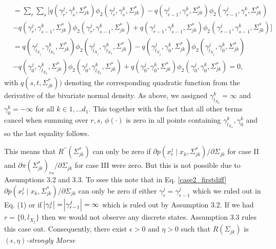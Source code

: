 \begin{condition}
\begin{condition}
\begin{equation*}
\begin{split}
                &= \sum_r\sum_s \Big[q(\gamma^j_r, \gamma^k_s, \Sigma_{jk}^*)\phi_2(\gamma^j_r, \gamma^k_s, \Sigma_{jk}^*) - q(\gamma^j_{r-1}, \gamma^k_s, \Sigma_{jk}^*)\phi_2(\gamma^j_{r-1}, \gamma^k_s, \Sigma_{jk}^*) \\
                &- q(\gamma^j_r, \gamma^k_{s-1}, \Sigma_{jk}^*)\phi_2(\gamma^j_r, \gamma^k_{s-1}, \Sigma_{jk}^*) + q(\gamma^j_{r-1}, \gamma^k_{s-1}, \Sigma_{jk}^*)\phi_2(\gamma^j_{r-1}, \gamma^k_{s-1}, \Sigma_{jk}^*)\Big] \\
                &= q(\gamma^j_{l_{X_j}}, \gamma^k_{l_{X_k}}, \Sigma_{jk}^*)\phi_2(\gamma^j_{l_{X_j}}, \gamma^k_{l_{X_k}}, \Sigma_{jk}^*) - q(\gamma^j_{l_{X_j}}, \gamma^k_0, \Sigma_{jk}^*)\phi_2(\gamma^j_{l_{X_j}}, \gamma^k_0, \Sigma_{jk}^*) \\
                &- q(\gamma^j_0, \gamma^k_{l_{X_k}}, \Sigma_{jk}^*)\phi_2(\gamma^j_0, \gamma^k_{l_{X_k}}, \Sigma_{jk}^*) + q(\gamma^j_0, \gamma^k_0, \Sigma_{jk}^*)\phi_2(\gamma^j_0, \gamma^k_0, \Sigma_{jk}^*) = 0,
            \end{split}
        \end{equation*}
        with $q(s,t,\Sigma_{jk}^*))$ denoting the corresponding quadratic function from the derivative of the bivariate normal density. As above, we assigned $\gamma^k_{l_{X_k}} = \infty$ and $\gamma^k_0 = -\infty$ for all $k \in 1, \dots d_1$. This together with the fact that all other terms cancel when summing over $r,s$, $\phi(\cdot)$ is zero in all points containing $\gamma^k_{l_{X_k}}, \gamma^k_0$ and so the last equality follows.  
        
        This means that $R^{\prime\prime}(\Sigma_{jk}^*)$ can only be zero if $\partial p(x^j_{r} \mid x_{k}, \Sigma_{jk}^*) / \partial \Sigma_{jk}$ for case II and $\partial \pi(\Sigma_{jk}^*)_{rs}/\partial \Sigma_{jk}$ for case III were zero. But this is not possible due to Assumptions 3.2 and 3.3.
        To ssee this note that in Eq. \eqref{case2_firstdiff} $\partial p(x^j_{r} \mid x_{k}, \Sigma_{jk}^*) / \partial \Sigma_{jk}$ can only be zero if either ${\gamma}_r^j = {\gamma}_{r-1}^j$ which we ruled out in Eq. (1) 
        or if $\abs{{\gamma}_r^j} = \abs{{\gamma}_{r-1}^j} = \infty$ which is ruled out by Assumption 3.2.
        If we had $r=\{0,l_{X_j}\}$ then we would not observe any discrete states. Assumption 3.3 
        rules this case out.
        Consequently, there exist $\epsilon > 0$ and $\eta > 0$ such that $R(\Sigma_{jk})$ is $(\epsilon,\eta)$\textit{-strongly Morse}
    \end{condition}
\end{condition}

